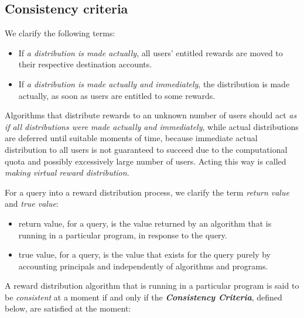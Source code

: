 \documentclass{article}
\begin{document}
\subsection{Consistency criteria}
\label{sec:Criteria}

We clarify the following terms:

\begin{itemize}
  \item If \textit{a distribution is made actually}, all users' entitled 
  rewards are moved to their respective destination accounts.
  \item If \textit{a distribution is made actually and immediately}, 
  the distribution is made actually, as soon as users are entitled to 
  some rewards.
\end{itemize}

Algorithms that distribute rewards to an unknown number of users should act 
\textit{as if all distributions were made actually and immediately}, 
while actual distributions are deferred until suitable moments of time, 
because immediate actual distribution to all users is not guaranteed to 
succeed due to the computational quota and possibly excessively large number of users.
Acting this way is called \textit{making virtual reward distribution}. 

For a query into a reward distribution process, 
we clarify the term \textit{return value} and \textit{true value}:
\begin{itemize}
  \item return value, for a query, is the value returned by an algorithm 
  that is running in a particular program, in response to the query.
  \item true value, for a query, is the value that exists for the query
  purely by accounting principals and independently of algorithms and programs.
\end{itemize}

A reward distribution algorithm that is running in a particular program 
is said to be \textit{consistent} at a moment  
if and only if the \textbf{\textit{Consistency Criteria}}, 
defined below, are satisfied at the moment:
\end{document}
